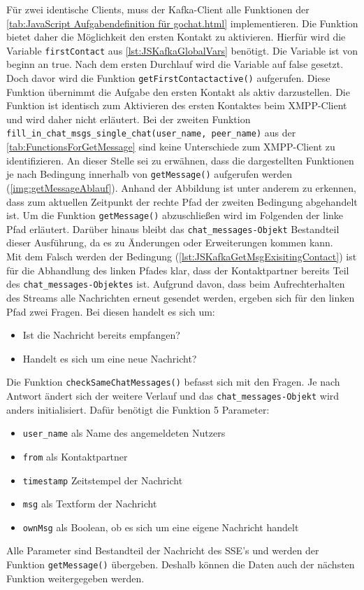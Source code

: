 \documentclass[a4paper,titlepage,halfparskip,12pt]{scrreprt}
\begin{document}
\begin{onehalfspacing}
Für zwei identische Clients, muss der Kafka-Client alle Funktionen der \autoref{tab:JavaScript Aufgabendefinition für gochat.html} implementieren. Die Funktion bietet daher die Möglichkeit den ersten Kontakt zu aktivieren. Hierfür wird die Variable \texttt{firstContact} aus \autoref{lst:JSKafkaGlobalVars} benötigt. Die Variable ist von beginn an true. Nach dem ersten Durchlauf wird die Variable auf false gesetzt. Doch davor wird die Funktion \texttt{getFirstContactactive()} aufgerufen. Diese Funktion übernimmt die Aufgabe den ersten Kontakt als aktiv darzustellen. Die Funktion ist identisch zum Aktivieren des ersten Kontaktes beim XMPP-Client und wird daher nicht erläutert. Bei der zweiten Funktion \texttt{fill\_in\_chat\_msgs\_single\_chat(user\_name, peer\_name)} aus der \autoref{tab:FunctionsForGetMessage} sind keine Unterschiede zum XMPP-Client zu identifizieren. An dieser Stelle sei zu erwähnen, dass die dargestellten Funktionen je nach Bedingung innerhalb von \texttt{getMessage()} aufgerufen werden (\autoref{img:getMessageAblauf}). Anhand der Abbildung ist unter anderem zu erkennen, dass zum aktuellen Zeitpunkt der rechte Pfad der zweiten Bedingung abgehandelt ist. Um die Funktion \texttt{getMessage()} abzuschließen wird im Folgenden der linke Pfad erläutert. Darüber hinaus bleibt das \texttt{chat\_messages-Objekt} Bestandteil dieser Ausführung, da es zu Änderungen oder Erweiterungen kommen kann.\\
Mit dem Falsch werden der Bedingung (\autoref{lst:JSKafkaGetMsgExisitingContact}) ist für die Abhandlung des linken Pfades klar, dass der Kontaktpartner bereits Teil des \texttt{chat\_messages-Objektes} ist. Aufgrund davon, dass beim Aufrechterhalten des Streams alle Nachrichten erneut gesendet werden, ergeben sich für den linken Pfad zwei Fragen. Bei diesen handelt es sich um:
\begin{itemize}
	\item Ist die Nachricht bereits empfangen?
	\item Handelt es sich um eine neue Nachricht?
\end{itemize}
Die Funktion \texttt{checkSameChatMessages()} befasst sich mit den Fragen. Je nach Antwort ändert sich der weitere Verlauf und das \texttt{chat\_messages-Objekt} wird anders initialisiert. Dafür benötigt die Funktion 5 Parameter:
\begin{itemize}
	\item \texttt{user\_name} als Name des angemeldeten Nutzers
	\item \texttt{from} als Kontaktpartner
	\item \texttt{timestamp} Zeitstempel der Nachricht
	\item \texttt{msg} als Textform der Nachricht	
	\item \texttt{ownMsg} als Boolean, ob es sich um eine eigene Nachricht handelt
\end{itemize}
Alle Parameter sind Bestandteil der Nachricht des SSE's und werden der Funktion \texttt{getMessage()} übergeben. Deshalb können die Daten auch der nächsten Funktion weitergegeben werden.


\end{onehalfspacing}
\end{document}

